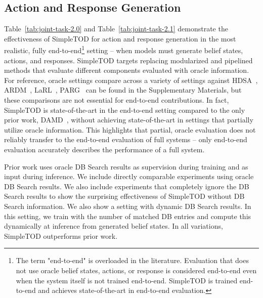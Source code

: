\documentclass{article}
\begin{document}
\subsection{Action and Response Generation}
\label{ssec:action_and_response}
Table~\ref{tab:joint-task-2.0} and Table~\ref{tab:joint-task-2.1} demonstrate the effectiveness of SimpleTOD for action and response generation in the most realistic, fully end-to-end\footnote{The term "end-to-end" is overloaded in the literature. 
Evaluation that does not use oracle belief states, actions, or response is considered end-to-end even when the system itself is not trained end-to-end. 
SimpleTOD is trained end-to-end and achieves state-of-the-art in end-to-end evaluation.} setting -- when models must generate belief states, actions, and responses. 
SimpleTOD targets replacing modularized and pipelined methods that evaluate different components evaluated with oracle information.
For reference, oracle settings compare across a variety of settings against HDSA~\cite{HDSA2019chen}, ARDM~\cite{wu2019alternating}, LaRL~\cite{zhao2019rethinking}, PARG~\cite{gao2020paraphrase} can be found in the Supplementary Materials, but these comparisons are not essential for end-to-end contributions.
In fact, SimpleTOD is state-of-the-art in the end-to-end setting compared to the only prior work, DAMD~\citep{DAMD2019zhang}, without achieving state-of-the-art in settings that partially utilize oracle information.
This highlights that partial, oracle evaluation does not reliably transfer to the end-to-end evaluation of full systems -- only end-to-end evaluation accurately describes the performance of a full system.

\iffalse
We report results in Table~\ref{tab:joint-task} and  for three different settings regularly employed in the literature.
These settings are determined by how much oracle information is used.
The first setting uses oracle belief states and oracle actions.
The second uses oracle belief states, but requires the system to generate its own actions.
The third requires the system to generate its own belief states and its own actions.
\fi

Prior work uses oracle DB Search results as supervision during training and as input during inference.
We include directly comparable experiments using oracle DB Search results.
We also include experiments that completely ignore the DB Search results to show the surprising effectiveness of SimpleTOD without DB Search information.
We also show a setting with dynamic DB Search results.
In this setting, 
we train with the number of matched DB entries and compute this dynamically at inference from generated belief states.
In all variations,
SimpleTOD outperforms prior work.
\end{document}
